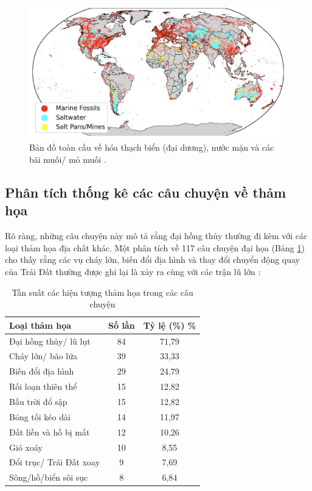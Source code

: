 \documentclass[10pt,twocolumn,letterpaper]{article}
\begin{document}
\begin{figure}[t]
\begin{center}
\includegraphics[width=1\textwidth]{marine.jpg}
\end{center}
   \caption{Bản đồ toàn cầu về hóa thạch biển (đại dương), nước mặn và các bãi muối/ mỏ muối \cite{15,16,86,87}.}
   \label{fig:2}
\end{figure}

\subsection{Phân tích thống kê các câu chuyện về thảm họa}

Rõ ràng, những câu chuyện này mô tả rằng đại hồng thủy thường đi kèm với các loại thảm họa địa chất khác. Một phân tích về 117 câu chuyện đại họa (Bảng \ref{tab: 1}) cho thấy rằng các vụ cháy lớn, biến đổi địa hình và thay đổi chuyển động quay của Trái Đất thường được ghi lại là xảy ra cùng với các trận lũ lớn \cite{14}:

\begin{table}[ht]
\begin{center}
\renewcommand{\arraystretch}{1.2}  %
\begin{tabular}{|l|c|c|}
\hline
\textbf{Loại thảm họa} & \textbf{Số lần} & \textbf{Tỷ lệ (\%) \%} \\
\hline\hline
Đại hồng thủy/ lũ lụt            & 84 & 71,79 \\
Cháy lớn/ bão lửa                & 39 & 33,33 \\
Biến đổi địa hình               & 29 & 24,79 \\
Rối loạn thiên thể            & 15 & 12,82 \\
Bầu trời đổ sập              & 15 & 12,82 \\

Bóng tối kéo dài      & 14 & 11,97 \\
Đất liền và hồ bị mất        & 12 & 10,26 \\
Gió xoáy                 & 10 & 8,55  \\
Đổi trục/ Trái Đất xoay     & 9 & 7,69  \\
Sông/hồ/biển sôi sục    & 8 & 6,84 \\
\hline
\end{tabular}
\end{center}
\caption{Tần suất các hiện tượng thảm họa trong các câu chuyện}
\label{tab: 1}
\end{table}
\end{document}
